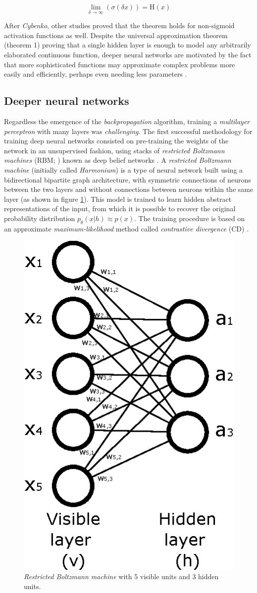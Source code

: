 \begin{equation}
	\label{eq:sigmoidToHeavyside}
	\lim_{\delta \rightarrow \infty} (\sigma(\delta x)) = \mathrm{H}(x)
\end{equation}



After \textit{Cybenko}, other studies \autocite{Leshno1993, pinkus1999} proved that the theorem holds for non-sigmoid activation functions as well. Despite the universal approximation theorem (theorem 1) proving that a single hidden layer is enough to model any arbitrarily elaborated continuous function, deeper neural networks are motivated by the fact that more sophisticated functions may approximate complex problems more easily and efficiently, perhaps even needing less parameters \autocite{nguyen21}.



\subsection{Deeper neural networks} \label{sec:deepernn}
Regardless the emergence of the \textit{backpropagation} algorithm, training a \textit{multilayer perceptron} with many layers was \textit{challenging}. The first successful methodology for training deep neural networks consisted on pre-training the weights of the network in an unsupervised fashion, using stacks of \textit{restricted Boltzmann machines} (RBM; \citealp{Smolensky1986}) known as deep belief networks \autocite{hinton2006, Bengio2007}. A \textit{restricted Boltzmann machine} (initially called \textit{Harmonium}) is a type of neural network built using a bidirectional bipartite graph architecture, with symmetric connections of neurons between the two layers and without connections between neurons within the same layer (as shown in figure \ref{fig:rbm}). This model is trained to learn hidden abstract representations of the input, from which it is possible to recover the original probability distribution $p_\theta(x|h) \approx p(x)$. The training procedure is based on an approximate \textit{maximum-likelihood} method called \textit{contrastive divergence} (CD) \autocite{hinton2002}.

\begin{figure}[h!]
	\centering
	\includegraphics[width=0.3\linewidth]{background/images/rbm}
	\caption[\textit{Restricted Boltzmann machine}]{\textit{Restricted Boltzmann machine} with 5 visible units and 3 hidden units.}
	\label{fig:rbm}
\end{figure}

